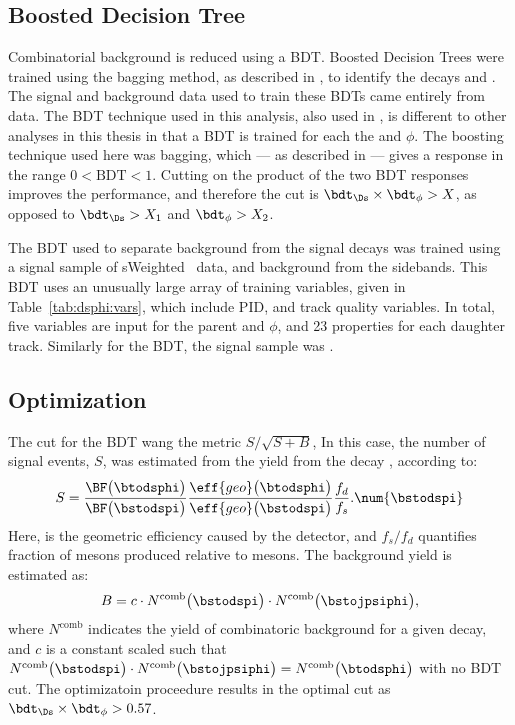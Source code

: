 \subsection{Boosted Decision Tree}
Combinatorial background is reduced using a BDT.
Boosted Decision Trees were trained using the bagging method, as described in , to
identify the decays \decay{\Ds}{\kkpi} and \decay{\phi}{\kk}.
The signal and background data used to train these BDTs came entirely from data.
The BDT technique used in this analysis, also used in , is different to
other analyses in this thesis in that a BDT is trained for each the \Ds and $\phi$.
The boosting technique used here was bagging, which --- as described in  --- gives
a response in the range $0<\mathrm{BDT}<1$.
Cutting on the product of the two BDT responses improves the performance, and therefore the cut is
$\bdt_{\Ds}\times\bdt_\phi>X$, as opposed to $\bdt_{\Ds}>X_1$ and $\bdt_\phi>X_2$.

The BDT used to separate background from the signal \decay{\Ds}{\kkpi} decays was trained using
a signal sample of \decay{\Bs}{\Dsm\pip} sWeighted~\cite{splot} data, and background from the \Dsm
sidebands.
This BDT uses an unusually large array of training variables, given in Table~\ref{tab:dsphi:vars},
which include PID, and track quality variables.
In total, five variables are input for the parent \Ds and $\phi$, and 23 properties for each
daughter track.
Similarly for the \decay{\phi}{\kk} BDT, the signal sample was \decay{\Bs}{\jpsi\phi}.


\subsection{Optimization}
The cut for the BDT wang the metric $S/\sqrt{S+B}$,
In this case, the number of signal events, $S$, was estimated from the yield from the decay
\decay{\Bs}{\Dsm\pip}, according to:
\begin{equation}
  S = \frac{ \BF\big(\btodsphi\big) }{ \BF\big(\bstodspi\big) }
  \frac{ \eff{geo}\big(\btodsphi\big) }{ \eff{geo}\big(\bstodspi\big) }
  \frac{f_d}{f_s}.
  \num{\bstodspi}
\end{equation}
Here,  is the geometric efficiency caused by the detector, and $f_s/f_d$ quantifies
fraction of \Bs mesons produced relative to \Bd mesons.
The background yield is estimated as:
\begin{equation}
  B = c\cdot N^\mathrm{comb}\big(\bstodspi\big)\cdot N^\mathrm{comb}\big(\bstojpsiphi\big),
\end{equation}
where $N^\mathrm{comb}$ indicates the yield of combinatoric background for a given decay, and
$c$ is a constant scaled such that
$N^\mathrm{comb}\big(\bstodspi\big)\cdot
N^\mathrm{comb}\big(\bstojpsiphi\big)=N^\mathrm{comb}\big(\btodsphi\big)$ with no BDT cut.
The optimizatoin proceedure results in the optimal cut as $\bdt_{\Ds}\times\bdt_\phi>0.57$.



